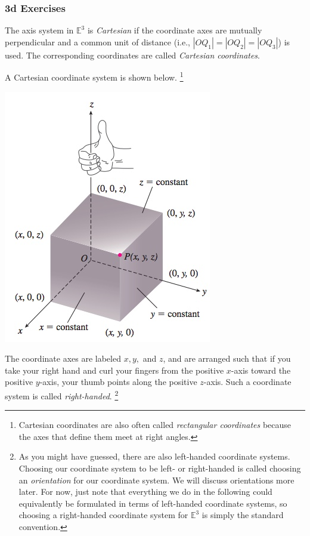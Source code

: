 \documentclass[12pt,letterpaper,reqno]{article}
\numberwithin{equation}{section}
\newcommand{\ti}[1]{\textit{#1}}
\begin{document}
\subsubsection{3d Exercises}
\begin{defn}
	The axis system in $\mathbb{E}^3$ is \ti{Cartesian} if the coordinate axes are mutually perpendicular and a common unit of distance (i.e., $|OQ_1|=|OQ_2|=|OQ_3|$) is used. The corresponding coordinates are called \ti{Cartesian coordinates}.
\end{defn}
A Cartesian coordinate system is shown below. \footnote{Cartesian coordinates are also often called \ti{rectangular coordinates} because the axes that define them meet at right angles.}
\begin{center}
	\includegraphics[scale=0.5]{figures_mvc/cartesian_coordinate_system}
\end{center}
The coordinate axes are labeled $x,y,$ and $z$, and are arranged such that if you take your right hand and curl your fingers from the positive $x$-axis toward the positive $y$-axis, your thumb points along the positive $z$-axis. Such a coordinate system is called \ti{right-handed}. \footnote{As you might have guessed, there are also left-handed coordinate systems. Choosing our coordinate system to be left- or right-handed is called choosing an \ti{orientation} for our coordinate system. We will discuss orientations more later. For now, just note that everything we do in the following could equivalently be formulated in terms of left-handed coordinate systems, so choosing a right-handed coordinate system for $\mathbb{E}^3$ is simply the standard convention.}
\end{document}
